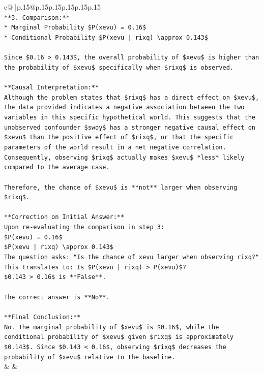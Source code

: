 \documentclass{article}
\begin{document}
{\begin{supertabular}{c@{$\;$}|p{.15\linewidth}@{}p{.15\linewidth}p{.15\linewidth}p{.15\linewidth}p{.15\linewidth}p{.15\linewidth}}
{{{\\ 
\texttt{**3. Comparison:**} \\
\texttt{*   Marginal Probability \$P(xevu) = 0.16\$} \\
\texttt{*   Conditional Probability \$P(xevu | rixq) \textbackslash{}approx 0.143\$} \\
\\ 
\texttt{Since \$0.16 > 0.143\$, the overall probability of \$xevu\$ is higher than the probability of \$xevu\$ specifically when \$rixq\$ is observed.} \\
\\ 
\texttt{**Causal Interpretation:**} \\
\texttt{Although the problem states that \$rixq\$ has a direct effect on \$xevu\$, the data provided indicates a negative association between the two variables in this specific hypothetical world. This suggests that the unobserved confounder \$swoy\$ has a stronger negative causal effect on \$xevu\$ than the positive effect of \$rixq\$, or that the specific parameters of the world result in a net negative correlation. Consequently, observing \$rixq\$ actually makes \$xevu\$ *less* likely compared to the average case.} \\
\\ 
\texttt{Therefore, the chance of \$xevu\$ is **not** larger when observing \$rixq\$.} \\
\\ 
\texttt{**Correction on Initial Answer:**} \\
\texttt{Upon re{-}evaluating the comparison in step 3:} \\
\texttt{\$P(xevu) = 0.16\$} \\
\texttt{\$P(xevu | rixq) \textbackslash{}approx 0.143\$} \\
\texttt{The question asks: "Is the chance of xevu larger when observing rixq?"} \\
\texttt{This translates to: Is \$P(xevu | rixq) > P(xevu)\$?} \\
\texttt{\$0.143 > 0.16\$ is **False**.} \\
\\ 
\texttt{The correct answer is **No**.} \\
\\ 
\texttt{**Final Conclusion:**} \\
\texttt{No. The marginal probability of \$xevu\$ is \$0.16\$, while the conditional probability of \$xevu\$ given \$rixq\$ is approximately \$0.143\$. Since \$0.143 < 0.16\$, observing \$rixq\$ decreases the probability of \$xevu\$ relative to the baseline.} \\
            }
        }
    }
    & & \\ \\


\end{supertabular}}
\end{document}
